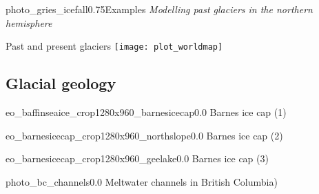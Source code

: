 
    \begin{sectionframe}{photo_gries_icefall}{0.75}{Examples}
      \emph{Modelling past glaciers in the northern hemisphere}
    \end{sectionframe}

    \begin{frame}{Past and present glaciers}
      \centering
      \texttt{[image: plot\_worldmap]}
    \end{frame}

\subsection{Glacial geology}

    \begin{backgroundframe}{eo_baffinseaice_crop1280x960_barnesicecap}{0.0}
                           {Barnes ice cap (1)}
    \end{backgroundframe}

    \begin{backgroundframe}{eo_barnesicecap_crop1280x960_northslope}{0.0}{}
                           {Barnes ice cap (2)}
    \end{backgroundframe}

    \begin{backgroundframe}{eo_barnesicecap_crop1280x960_geelake}{0.0}{}
                           {Barnes ice cap (3)}
    \end{backgroundframe}

    \begin{backgroundframe}{photo_bc_channels}{0.0}{}
                           {Meltwater channels in British Columbia)}
    \end{backgroundframe}

